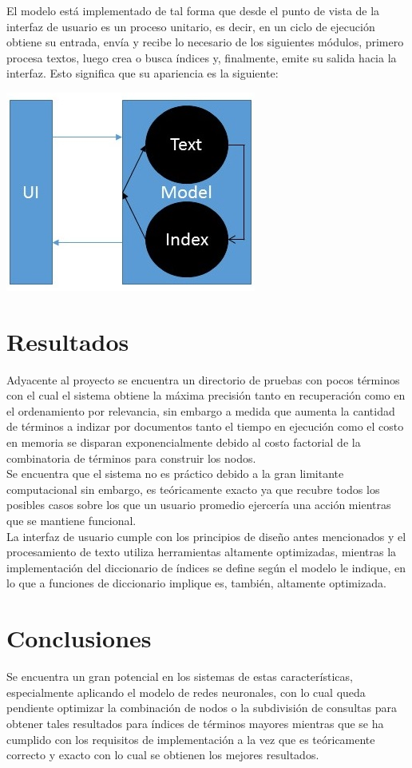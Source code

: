 \documentclass{llncs}
\begin{document}
El modelo est\'a implementado de tal forma que desde el punto de vista de la interfaz de usuario es un proceso unitario, es decir, en un ciclo de
ejecuci\'on obtiene su entrada, env\'ia y recibe lo necesario de los siguientes m\'odulos, primero procesa textos, luego crea o busca \'indices y,
finalmente, emite su salida hacia la interfaz. Esto significa que su apariencia es la siguiente:

{\includegraphics[]{appereance}}
{\hfil{}}

\section{Resultados}
Adyacente al proyecto se encuentra un directorio de pruebas con pocos t\'erminos con el cual el sistema obtiene la m\'axima precisi\'on tanto en
recuperaci\'on como en el ordenamiento por relevancia, sin embargo a medida que aumenta la cantidad de t\'erminos a indizar por documentos
tanto el tiempo en ejecuci\'on como el costo en memoria se disparan exponencialmente debido al costo factorial de la combinatoria de t\'erminos
para construir los nodos.\\
Se encuentra que el sistema no es pr\'actico debido a la gran limitante computacional sin embargo, es te\'oricamente exacto ya que recubre todos
los posibles casos sobre los que un usuario promedio ejercer\'ia una acci\'on mientras que se mantiene funcional.\\
La interfaz de usuario cumple con los principios de dise\~no antes mencionados y el procesamiento de texto utiliza herramientas altamente optimizadas,
mientras la implementaci\'on del diccionario de \'indices se define seg\'un el modelo le indique, en lo que a funciones de diccionario implique es, tambi\'en,
altamente optimizada.

\section{Conclusiones}
Se encuentra un gran potencial en los sistemas de estas caracter\'isticas, especialmente aplicando el modelo de redes neuronales, con lo cual queda 
pendiente optimizar la combinaci\'on de nodos o la subdivisi\'on de consultas para obtener tales resultados para \'indices de t\'erminos mayores mientras
que se ha cumplido con los requisitos de implementaci\'on a la vez que es te\'oricamente correcto y exacto con lo cual se obtienen los mejores resultados.
\end{document}

